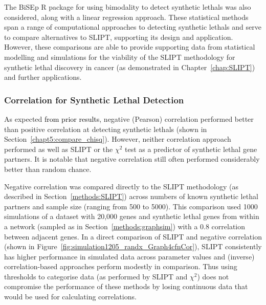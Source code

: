The \gls{BiSEp} R package \citep{Wappett2014} for using bimodality to detect \glspl{synthetic lethal} \citep{Wappett2016} was also considered, along with a linear regression approach. These statistical methods span a range of computational approaches to detecting \glspl{synthetic lethal} and serve to compare alternatives to \gls{SLIPT}, supporting its design and application.
However, these comparisons are able \textcolor{black}{to} provide supporting data from statistical modelling and simulations for the viability of the \gls{SLIPT} methodology for \gls{synthetic lethal} discovery in cancer (as demonstrated in Chapter~\ref{chap:SLIPT}) and further applications.

\subsubsection{Correlation for Synthetic Lethal Detection}
\label{chapt5:compare_correlation}

\FloatBarrier

As expected \textcolor{black}{from prior results}, negative (Pearson) correlation performed better than positive correlation at detecting \glspl{synthetic lethal} (shown in Section~\ref{chapt5:compare_chisq}). %
However, neither correlation approach performed as well as \gls{SLIPT} or the $\chi^2$ test as a predictor of \gls{synthetic lethal} gene partners. It is notable that negative correlation still often performed considerably better than random chance.
    
    
Negative correlation was compared directly to the \gls{SLIPT} methodology (as described in Section~\ref{methods:SLIPT}) across numbers of known \gls{synthetic lethal} partners and sample size (ranging from 500 to 5000). This comparison used 1000 simulations of a dataset with 20,000 genes and \gls{synthetic lethal} genes from within a network (sampled as in Section~\ref{methods:graphsim}) with a 0.8 correlation between adjacent genes. In a direct comparison of \gls{SLIPT} and negative correlation (shown in Figure~\ref{fig:simulation1205_randx_Graph4cfnCor}), \gls{SLIPT} consistently has higher performance in simulated data across parameter values and (inverse) correlation-based approaches perform modestly in comparison. Thus using thresholds to categorise  data (as performed by \gls{SLIPT} and $\chi^2$) does not compromise the performance of these methods by losing continuous data that would be used for calculating correlations. %



